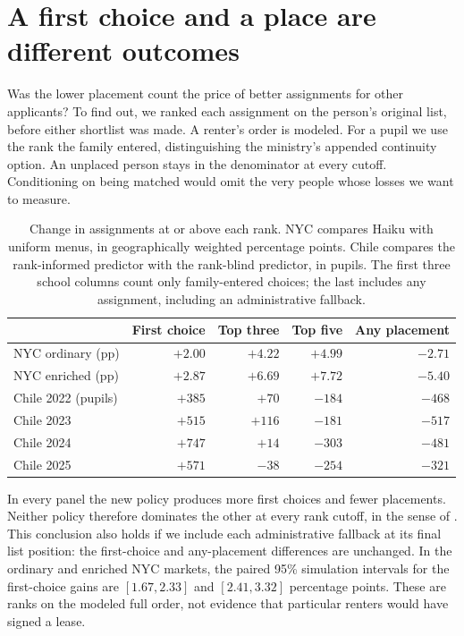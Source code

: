 \section{A first choice and a place are different outcomes}\label{sec:ranks}
Was the lower placement count the price of better assignments for other applicants? To find out, we ranked each assignment on the person's original list, before either shortlist was made. A renter's order is modeled. For a pupil we use the rank the family entered, distinguishing the ministry's appended continuity option. An unplaced person stays in the denominator at every cutoff. Conditioning on being matched would omit the very people whose losses we want to measure.

\begin{table}[ht]\centering\small
\caption{Change in assignments at or above each rank. NYC compares Haiku with uniform menus, in geographically weighted percentage points. Chile compares the rank-informed predictor with the rank-blind predictor, in pupils. The first three school columns count only family-entered choices; the last includes any assignment, including an administrative fallback.}\label{tab:ranks}
\begin{tabular}{@{}lrrrr@{}}\toprule
 & First choice & Top three & Top five & Any placement\\\midrule
NYC ordinary (pp) & $+2.00$ & $+4.22$ & $+4.99$ & $-2.71$\\
NYC enriched (pp) & $+2.87$ & $+6.69$ & $+7.72$ & $-5.40$\\\addlinespace
Chile 2022 (pupils) & $+385$ & $+70$ & $-184$ & $-468$\\
Chile 2023 & $+515$ & $+116$ & $-181$ & $-517$\\
Chile 2024 & $+747$ & $+14$ & $-303$ & $-481$\\
Chile 2025 & $+571$ & $-38$ & $-254$ & $-321$\\\bottomrule
\end{tabular}
\end{table}

In every panel the new policy produces more first choices and fewer placements. Neither policy therefore dominates the other at every rank cutoff, in the sense of \citet{featherstone}. This conclusion also holds if we include each administrative fallback at its final list position: the first-choice and any-placement differences are unchanged. In the ordinary and enriched NYC markets, the paired 95\% simulation intervals for the first-choice gains are $[1.67,2.33]$ and $[2.41,3.32]$ percentage points. These are ranks on the modeled full order, not evidence that particular renters would have signed a lease.

